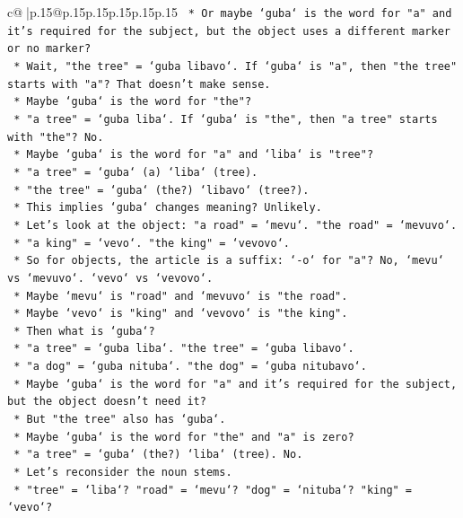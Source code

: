 \documentclass{article}
\begin{document}
{\begin{supertabular}{c@{$\;$}|p{.15\linewidth}@{}p{.15\linewidth}p{.15\linewidth}p{.15\linewidth}p{.15\linewidth}p{.15\linewidth}}
{{{\texttt{        *   Or maybe `guba` is the word for "a" and it's required for the subject, but the object uses a different marker or no marker?} \\
\texttt{        *   Wait, "the tree" = `guba libavo`. If `guba` is "a", then "the tree" starts with "a"? That doesn't make sense.} \\
\texttt{        *   Maybe `guba` is the word for "the"?} \\
\texttt{        *   "a tree" = `guba liba`. If `guba` is "the", then "a tree" starts with "the"? No.} \\
\texttt{        *   Maybe `guba` is the word for "a" and `liba` is "tree"?} \\
\texttt{        *   "a tree" = `guba` (a) `liba` (tree).} \\
\texttt{        *   "the tree" = `guba` (the?) `libavo` (tree?).} \\
\texttt{        *   This implies `guba` changes meaning? Unlikely.} \\
\texttt{        *   Let's look at the object: "a road" = `mevu`. "the road" = `mevuvo`.} \\
\texttt{        *   "a king" = `vevo`. "the king" = `vevovo`.} \\
\texttt{        *   So for objects, the article is a suffix: `{-}o` for "a"? No, `mevu` vs `mevuvo`. `vevo` vs `vevovo`.} \\
\texttt{        *   Maybe `mevu` is "road" and `mevuvo` is "the road".} \\
\texttt{        *   Maybe `vevo` is "king" and `vevovo` is "the king".} \\
\texttt{        *   Then what is `guba`?} \\
\texttt{        *   "a tree" = `guba liba`. "the tree" = `guba libavo`.} \\
\texttt{        *   "a dog" = `guba nituba`. "the dog" = `guba nitubavo`.} \\
\texttt{        *   Maybe `guba` is the word for "a" and it's required for the subject, but the object doesn't need it?} \\
\texttt{        *   But "the tree" also has `guba`.} \\
\texttt{        *   Maybe `guba` is the word for "the" and "a" is zero?} \\
\texttt{        *   "a tree" = `guba` (the?) `liba` (tree). No.} \\
\texttt{        *   Let's reconsider the noun stems.} \\
\texttt{        *   "tree" = `liba`? "road" = `mevu`? "dog" = `nituba`? "king" = `vevo`?} \\
}}}
\end{supertabular}}
\end{document}
